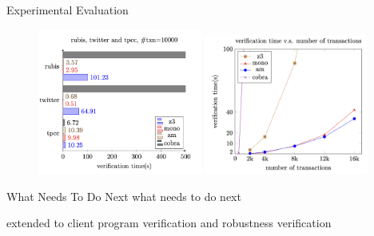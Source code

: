 \begin{frame}{Experimental Evaluation}
	\begin{figure}[H]
		\centering
		\includegraphics[width=0.48\textwidth]{figs/ser-checker-rubis-twitter-and-tpcc-ntxn10000.png}
		\includegraphics[width=0.48\textwidth]{figs/ser-checker-chengRW-verification-time-vs-ntxns.png}
	\end{figure}
\end{frame}

\begin{frame}{What Needs To Do Next}
	what needs to do next
\end{frame}

\begin{frame}
	extended to client program verification and robustness verification
\end{frame}
